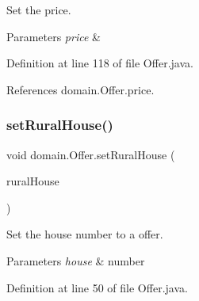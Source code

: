 Set the price. 


\begin{DoxyParams}{Parameters}
{\em price} & \\
\hline
\end{DoxyParams}


Definition at line 118 of file Offer.\+java.


\begin{DoxyCode}{0}

\end{DoxyCode}


References domain.\+Offer.\+price.

\mbox{\label{classdomain_1_1Offer_a2050ed4cf76a2a2863d08e89bdf4a7df}} 
\subsubsection{\texorpdfstring{setRuralHouse()}{setRuralHouse()}}
{\footnotesize\ttfamily void domain.\+Offer.\+set\+Rural\+House (\begin{DoxyParamCaption}\item[{\mbox{\hyperlink{classdomain_1_1RuralHouse}{Rural\+House}}}]{rural\+House }\end{DoxyParamCaption})}



Set the house number to a offer. 


\begin{DoxyParams}{Parameters}
{\em house} & number \\
\hline
\end{DoxyParams}


Definition at line 50 of file Offer.\+java.


\begin{DoxyCode}{0}

\end{DoxyCode}


